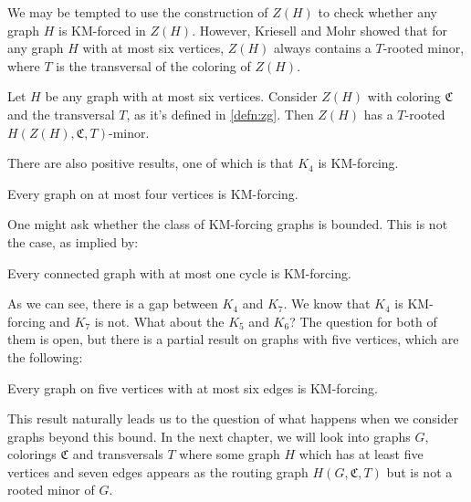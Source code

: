 
We may be tempted to use the construction of \( Z(H) \) to check whether any graph $H$ is KM-forced in $Z(H)$. 
However, Kriesell and Mohr showed that for any graph \( H \) with at most six vertices, \( Z(H) \) always contains a \( T \)-rooted minor, where $T$ is the transversal of 
the coloring of $Z(H)$. 

\begin{thm}\label{thm:zg-for-k_6}
 Let $H$ be any graph with at most six vertices. Consider $Z(H)$ with coloring
    $\mathfrak{C}$ and the transversal $T$, as it's defined in \ref{defn:zg}. Then $Z(H)$ has a 
 $T$-rooted $H(Z(H), \mathfrak{C}, T)$-minor.
\end{thm}


There are also positive results, one of which is that $K_4$ is KM-forcing.

\begin{thm}\label{thm:6}
Every graph on at most four vertices is KM-forcing.
\end{thm}

One might ask whether the class of KM-forcing graphs is bounded. 
This is not the case, as implied by:

\begin{thm}\label{thm:4}
Every connected graph with at most one cycle is KM-forcing.
\end{thm}

As we can see, there is a gap between $K_4$ and $K_7$. We know that $K_4$ is KM-forcing and $K_7$ is not. What about the $K_5$ and $K_6$? The question for both of them is open, but there is a partial result on graphs with five 
vertices, which are the following:

\begin{thm}\label{thm:5}
Every graph on five vertices with at most six edges is KM-forcing.
\end{thm}

This result naturally leads us to the question of what happens when we consider graphs beyond this bound. 
In the next chapter, we will look into graphs \( G \), colorings $\mathfrak{C}$ and transversals
$T$ where some graph \( H \) which has at least five vertices and 
seven edges appears as the routing graph \( H(G, \mathfrak{C}, T) \) but is not a rooted minor of \( G \).